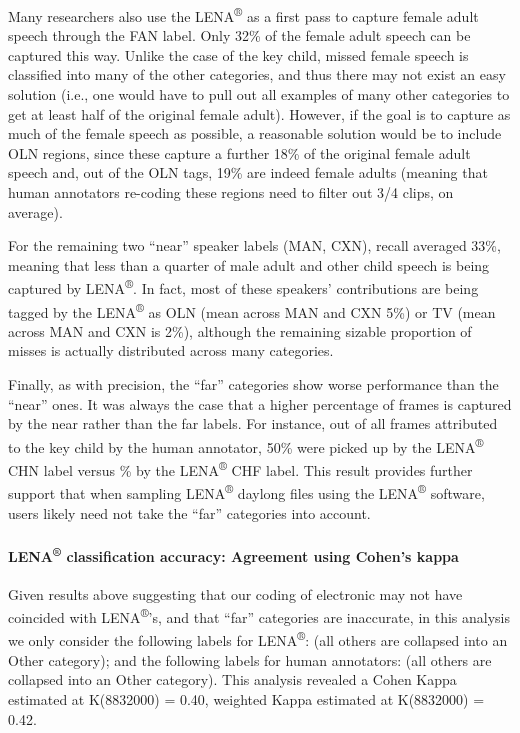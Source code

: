 \documentclass[english,table,man,floatsintext]{apa6}
\let\oldparagraph\paragraph
\renewcommand{\paragraph}[1]{\oldparagraph{#1}\mbox{}}
\begin{document}
Many researchers also use the LENA\textsuperscript{®} as a first pass to capture female adult speech through the FAN label. Only 32\% of the female adult speech can be captured this way. Unlike the case of the key child, missed female speech is classified into many of the other categories, and thus there may not exist an easy solution (i.e., one would have to pull out all examples of many other categories to get at least half of the original female adult). However, if the goal is to capture as much of the female speech as possible, a reasonable solution would be to include OLN regions, since these capture a further 18\% of the original female adult speech and, out of the OLN tags, 19\% are indeed female adults (meaning that human annotators re-coding these regions need to filter out 3/4 clips, on average).

For the remaining two \enquote{near} speaker labels (MAN, CXN), recall averaged 33\%, meaning that less than a quarter of male adult and other child speech is being captured by LENA\textsuperscript{®}. In fact, most of these speakers' contributions are being tagged by the LENA\textsuperscript{®} as OLN (mean across MAN and CXN 5\%) or TV (mean across MAN and CXN is 2\%), although the remaining sizable proportion of misses is actually distributed across many categories.

Finally, as with precision, the \enquote{far} categories show worse performance than the \enquote{near} ones. It was always the case that a higher percentage of frames is captured by the near rather than the far labels. For instance, out of all frames attributed to the key child by the human annotator, 50\% were picked up by the LENA\textsuperscript{®} CHN label versus \% by the LENA\textsuperscript{®} CHF label. This result provides further support that when sampling LENA\textsuperscript{®} daylong files using the LENA\textsuperscript{®} software, users likely need not take the \enquote{far} categories into account.

\hypertarget{lena-classification-accuracy-agreement-using-cohens-kappa}{%
\paragraph{\texorpdfstring{LENA\textsuperscript{®} classification accuracy: Agreement using Cohen's kappa}{LENA® classification accuracy: Agreement using Cohen's kappa}}\label{lena-classification-accuracy-agreement-using-cohens-kappa}}

Given results above suggesting that our coding of electronic may not have coincided with LENA\textsuperscript{®}'s, and that \enquote{far} categories are inaccurate, in this analysis we only consider the following labels for LENA\textsuperscript{®}: (all others are collapsed into an Other category); and the following labels for human annotators: (all others are collapsed into an Other category). This analysis revealed a Cohen Kappa estimated at K(8832000) = 0.40, weighted Kappa estimated at K(8832000) = 0.42.
\end{document}
